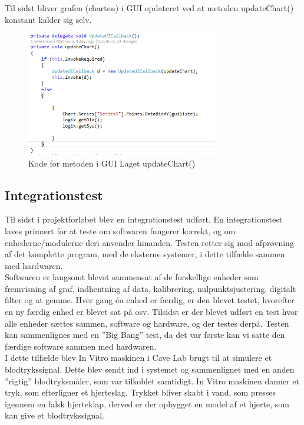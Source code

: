 Til sidst bliver grafen (charten) i GUI opdateret ved at metoden updateChart() konstant kalder sig selv.

\begin{figure}[H]
	\centering
	\includegraphics[width=0.75\textwidth]{FigurerProgram/updateChart}
	\caption{Kode for metoden i GUI Laget updateChart()}
	\label{fig:updateChart}
\end{figure}

\subsection{Integrationstest}
Til sidst i projektforløbet blev en integrationstest\cite{Integration} udført. En integrationstest laves primært for at teste om softwaren fungerer korrekt, og om enhederne/modulerne deri anvender hinanden. Testen retter sig mod afprøvning af det komplette program, med de eksterne systemer, i dette tilfælde sammen med hardwaren.\\
Softwaren er langsomt blevet sammensat af de forskellige enheder som fremvisning af graf, indhentning af data, kalibrering, nulpunktsjustering, digitalt filter og at gemme. Hver gang én enhed er færdig, er den blevet testet, hvorefter en ny færdig enhed er blevet sat på osv. Tilsidst er der blevet udført  en test hvor alle enheder sættes sammen, software og hardware,  og der testes derpå. Testen kan sammenlignes med en ”Big Bang” test, da det var første kan vi satte den færdige software sammen med hardwaren.\\  
I dette tilfælde blev In Vitro maskinen i Cave Lab brugt til at simulere et blodtrykssignal. Dette blev sendt ind i systemet og sammenlignet med en anden ”rigtig” blodtryksmåler, som var tilkoblet samtidigt. In Vitro maskinen danner et tryk, som efterligner et hjerteslag. Trykket bliver skabt i vand, som presses igennem en falsk hjerteklap, derved er der opbygget en model af et hjerte, som kan give et blodtrykssignal. 

